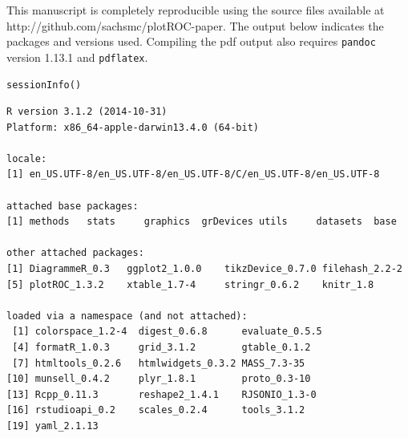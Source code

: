\documentclass[article]{jss}
\begin{document}
This manuscript is completely reproducible using the source files
available at http://github.com/sachsmc/plotROC-paper. The output below
indicates the  packages and versions used. Compiling the pdf
output also requires \texttt{pandoc} version 1.13.1 and
\texttt{pdflatex}.

\begin{verbatim}
sessionInfo()
\end{verbatim}

\begin{verbatim}
R version 3.1.2 (2014-10-31)
Platform: x86_64-apple-darwin13.4.0 (64-bit)

locale:
[1] en_US.UTF-8/en_US.UTF-8/en_US.UTF-8/C/en_US.UTF-8/en_US.UTF-8

attached base packages:
[1] methods   stats     graphics  grDevices utils     datasets  base     

other attached packages:
[1] DiagrammeR_0.3   ggplot2_1.0.0    tikzDevice_0.7.0 filehash_2.2-2  
[5] plotROC_1.3.2    xtable_1.7-4     stringr_0.6.2    knitr_1.8       

loaded via a namespace (and not attached):
 [1] colorspace_1.2-4  digest_0.6.8      evaluate_0.5.5   
 [4] formatR_1.0.3     grid_3.1.2        gtable_0.1.2     
 [7] htmltools_0.2.6   htmlwidgets_0.3.2 MASS_7.3-35      
[10] munsell_0.4.2     plyr_1.8.1        proto_0.3-10     
[13] Rcpp_0.11.3       reshape2_1.4.1    RJSONIO_1.3-0    
[16] rstudioapi_0.2    scales_0.2.4      tools_3.1.2      
[19] yaml_2.1.13      
\end{verbatim}


%

\end{document}
